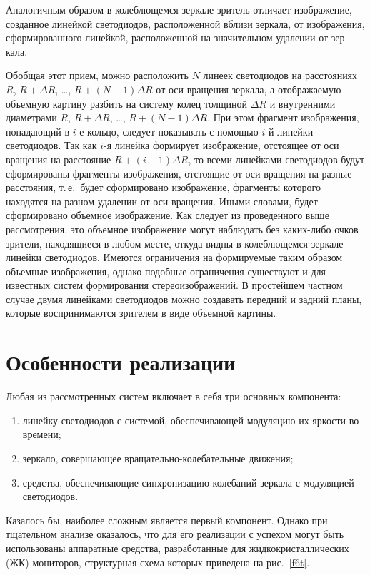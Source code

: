 \begin{multicols}{2}
   Аналогичным 
образом в колеблющемся зеркале зритель отличает изображение, созданное линейкой 
светодиодов, расположенной вблизи зеркала, от изображения, сформированного 
линейкой, расположенной на значительном удалении от зер-\linebreak
кала. 


  Обобщая этот прием, можно расположить $N$ линеек светодиодов на расстояниях $R$, 
$R + \Delta R$, \ldots , $R + (N-1)\Delta R$ от оси вращения зеркала, а отоб\-ра\-жа\-емую 
объемную картину разбить на систему колец толщиной $\Delta R$ и внутренними 
диаметрами $R$, $R + \Delta R$, \ldots , $R + (N-1)\Delta R$. При этом фрагмент 
изображения, попадающий в $i$-е кольцо, следует показывать с помощью $i$-й линейки 
светодиодов. Так как $i$-я линейка формирует изображение, отстоящее от оси вращения 
на расстояние $R + (i-1)\Delta R$, то всеми линейками светодиодов будут сформированы 
фрагменты изображения, отстоящие от оси вращения на разные расстояния, т.\,е.\ будет 
сформировано изображение, фрагменты которого находятся на разном удалении от оси 
вращения. Иными словами, будет сформировано объемное изображение. Как следует из 
проведенного выше рас\-смот\-ре\-ния, это объемное изображение могут наблюдать без 
  каких-либо очков зрители, находящиеся в любом месте, откуда видны в колеблющемся 
зеркале линейки светодиодов. Имеются ограничения на формируемые таким образом 
объемные изображения, однако подобные ограничения существуют и для известных 
систем формирования стереоизображений. В простейшем частном случае двумя 
линейками светодиодов можно создавать передний и задний планы, которые 
воспринимаются зрителем в виде объемной картины. 

\section{Особенности реализации}

  Любая из рассмотренных систем включает в себя три основных компонента:
\begin{enumerate}[(1)]
\item линейку светодиодов с системой, обеспечи\-ва\-ющей модуляцию их яркости во 
времени; 
\item зеркало, совершающее вращательно-ко\-ле\-ба\-тель\-ные движения; 
\item средства, обеспечивающие синхронизацию колебаний зеркала с модуляцией 
светодиодов.  
\end{enumerate}
  
  Казалось бы, наиболее сложным является первый компонент. Однако при тщательном 
анализе оказалось, что для его реализации с успехом могут быть использованы 
аппаратные средства, разработанные для жидкокристаллических (ЖК) мониторов, структурная 
схема которых приведена на рис.~\ref{f6t}. 
  

\end{multicols}
